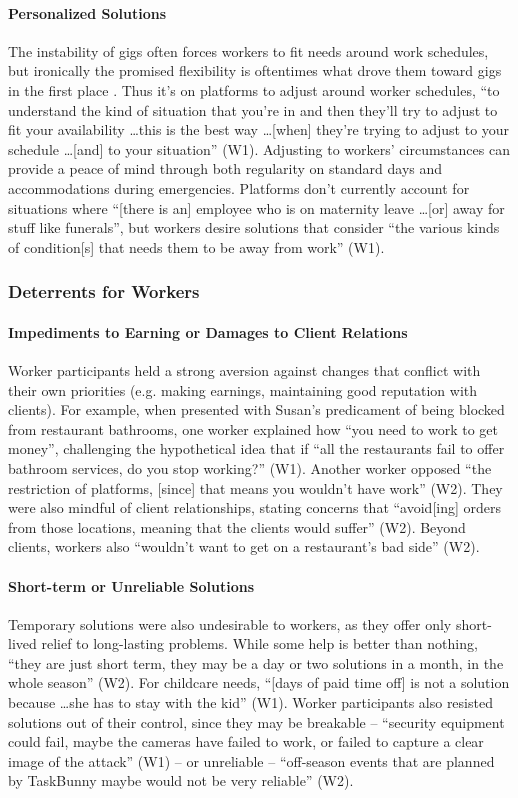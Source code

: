 \paragraph{Personalized Solutions} \label{personalized}
The instability of gigs often forces workers to fit needs around work schedules, but ironically the promised flexibility is oftentimes what drove them toward gigs in the first place \cite{machines}. Thus it's on platforms to adjust around worker schedules, ``to understand the kind of situation that you're in and then they'll try to adjust to fit your availability \dots this is the best way \dots [when] they're trying to adjust to your schedule \dots [and] to your situation'' (W1). Adjusting to workers' circumstances can provide a peace of mind through both regularity on standard days and accommodations during emergencies. Platforms don't currently account for situations where ``[there is an] employee who is on maternity leave \dots [or] away for stuff like funerals'', but workers desire solutions that consider ``the various kinds of condition[s] that needs them to be away from work'' (W1).

\subsubsection{Deterrents for Workers}
\paragraph{Impediments to Earning or Damages to Client Relations}
Worker participants held a strong aversion against changes that conflict with their own priorities (e.g. making earnings, maintaining good reputation with clients). For example, when presented with Susan's predicament of being blocked from restaurant bathrooms, one worker explained how ``you need to work to get money'', challenging the hypothetical idea that if ``all the restaurants fail to offer bathroom services, do you stop working?'' (W1). Another worker opposed ``the restriction of platforms, [since] that means you wouldn't have work'' (W2). They were also mindful of client relationships, stating concerns that ``avoid[ing] orders from those locations, meaning that the clients would suffer'' (W2). 
Beyond clients, workers also ``wouldn't want to get on a restaurant's bad side'' (W2).


\paragraph{Short-term or Unreliable Solutions}
Temporary solutions were also undesirable to workers, as they offer only short-lived relief to long-lasting problems. While some help is better than nothing, ``they are just short term, they may be a day or two solutions in a month, in the whole season'' (W2). For childcare needs, ``[days of paid time off] is not a solution because \dots she has to stay with the kid'' (W1). Worker participants also resisted solutions out of their control, since they may be breakable -- ``security equipment could fail, maybe the cameras have failed to work, or failed to capture a clear image of the attack'' (W1) -- or unreliable -- ``off-season events that are planned by TaskBunny maybe would not be very reliable'' (W2).

